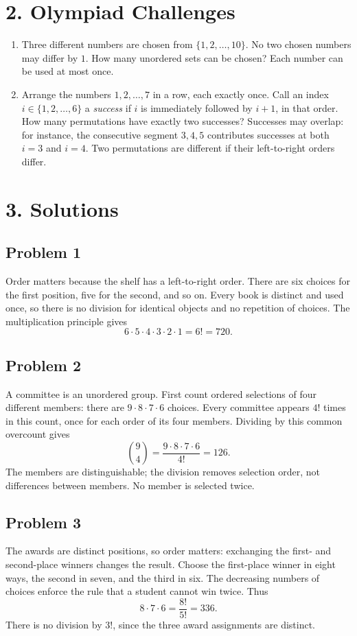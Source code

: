 \documentclass[12pt]{article}
\newcommand{\solution}[1]{\par\Needspace{8\baselineskip}\subsection*{Problem #1}}
\begin{document}
\section*{2. Olympiad Challenges}

\begin{enumerate}[label=\textbf{\arabic*.},start=7]
\item Three different numbers are chosen from $\{1,2,\ldots,10\}$.
No two chosen numbers may differ by $1$. How many unordered sets can be
chosen? Each number can be used at most once.

\item Arrange the numbers $1,2,\ldots,7$ in a row, each exactly once.
Call an index $i\in\{1,2,\ldots,6\}$ a \emph{success} if $i$ is
immediately followed by $i+1$, in that order. How many permutations
have exactly two successes? Successes may overlap: for instance,
the consecutive segment $3,4,5$ contributes successes at both $i=3$
and $i=4$. Two permutations are different if their left-to-right orders differ.
\end{enumerate}

\clearpage
\section*{3. Solutions}

\solution{1}
Order matters because the shelf has a left-to-right order. There are six
choices for the first position, five for the second, and so on. Every
book is distinct and used once, so there is no division for identical
objects and no repetition of choices. The multiplication principle gives
\[
6\cdot5\cdot4\cdot3\cdot2\cdot1=6!=\boxed{720}.
\]

\solution{2}
A committee is an unordered group. First count ordered selections of
four different members: there are $9\cdot8\cdot7\cdot6$ choices.
Every committee appears $4!$ times in this count, once for each order of
its four members. Dividing by this common overcount gives
\[
\binom94=\frac{9\cdot8\cdot7\cdot6}{4!}=\boxed{126}.
\]
The members are distinguishable; the division removes selection order,
not differences between members. No member is selected twice.

\solution{3}
The awards are distinct positions, so order matters: exchanging the first-
and second-place winners changes the result. Choose the first-place
winner in eight ways, the second in seven, and the third in six.
The decreasing numbers of choices enforce the rule that a student cannot
win twice. Thus
\[
8\cdot7\cdot6=\frac{8!}{5!}=\boxed{336}.
\]
There is no division by $3!$, since the three award assignments are distinct.
\end{document}
